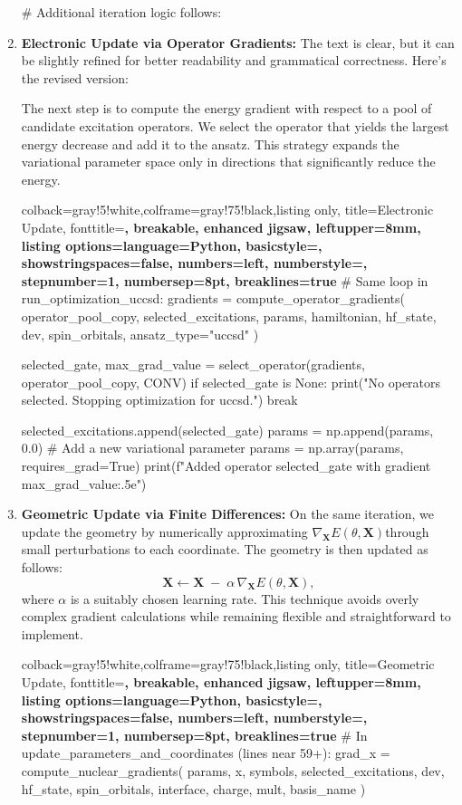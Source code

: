 \begin{enumerate}
\begin{tcblisting}
    # Additional iteration logic follows:
    \end{tcblisting}

    \item \textbf{Electronic Update via Operator Gradients:}
    The text is clear, but it can be slightly refined for better readability and grammatical correctness. Here's the revised version:

    The next step is to compute the energy gradient with respect to a pool of candidate excitation operators. We select the operator that yields the largest energy decrease and add it to the ansatz. This strategy expands the variational parameter space only in directions that significantly reduce the energy.
    \begin{tcblisting}{colback=gray!5!white,colframe=gray!75!black,listing only,
        title=Electronic Update, fonttitle=\bfseries, breakable, enhanced jigsaw, leftupper=8mm,
        listing options={language=Python, basicstyle=\ttfamily\small,
        showstringspaces=false, numbers=left, numberstyle=\footnotesize,
        stepnumber=1, numbersep=8pt, breaklines=true}}
# Same loop in run_optimization_uccsd:
gradients = compute_operator_gradients(
    operator_pool_copy,
    selected_excitations,
    params,
    hamiltonian,
    hf_state,
    dev,
    spin_orbitals,
    ansatz_type="uccsd"
)

selected_gate, max_grad_value = select_operator(gradients, operator_pool_copy, CONV)
if selected_gate is None:
    print("No operators selected. Stopping optimization for uccsd.")
    break

selected_excitations.append(selected_gate)
params = np.append(params, 0.0)  # Add a new variational parameter
params = np.array(params, requires_grad=True)
print(f"Added operator {selected_gate} with gradient {max_grad_value:.5e}")
    \end{tcblisting}

    \item \textbf{Geometric Update via Finite Differences:}
    On the same iteration, we update the geometry by numerically approximating \(\nabla_{\mathbf{X}}E(\theta, \mathbf{X})\)through small perturbations to each coordinate. The geometry is then updated as follows:
    \[
    \mathbf{X} \leftarrow \mathbf{X} \;-\; \alpha\, \nabla_{\mathbf{X}} E(\theta, \mathbf{X}),
    \]
    where \(\alpha\) is a suitably chosen learning rate. This technique avoids overly complex gradient calculations while remaining flexible and straightforward to implement.
    \begin{tcblisting}{colback=gray!5!white,colframe=gray!75!black,listing only,
        title=Geometric Update, fonttitle=\bfseries, breakable, enhanced jigsaw, leftupper=8mm,
        listing options={language=Python, basicstyle=\ttfamily\small,
        showstringspaces=false, numbers=left, numberstyle=\footnotesize,
        stepnumber=1, numbersep=8pt, breaklines=true}}
# In update_parameters_and_coordinates (lines near 59+):
grad_x = compute_nuclear_gradients(
    params, x, symbols, selected_excitations, dev,
    hf_state, spin_orbitals, interface, charge, mult, basis_name
)


\end{tcblisting}
\end{enumerate}

